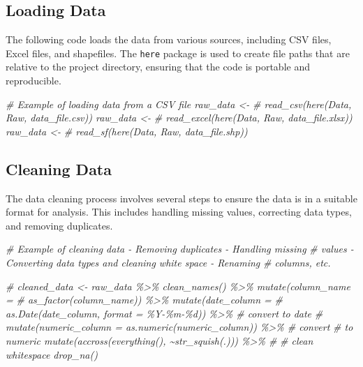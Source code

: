 \documentclass[
  12pt,
]{article}
\newenvironment{Shaded}{\begin{snugshade}}{\end{snugshade}}
\newcommand{\CommentTok}[1]{\textcolor[rgb]{0.56,0.35,0.01}{\textit{#1}}}
\begin{document}
\subsection{Loading Data}\label{loading-data}

The following code loads the data from various sources, including CSV
files, Excel files, and shapefiles. The \texttt{here} package is used to
create file paths that are relative to the project directory, ensuring
that the code is portable and reproducible.

\begin{Shaded}
\begin{Highlighting}[]
\CommentTok{\# Example of loading data from a CSV file raw\_data \textless{}{-}}
\CommentTok{\# read\_csv(here(\textquotesingle{}Data\textquotesingle{}, \textquotesingle{}Raw\textquotesingle{}, \textquotesingle{}data\_file.csv\textquotesingle{})) raw\_data \textless{}{-}}
\CommentTok{\# read\_excel(here(\textquotesingle{}Data\textquotesingle{}, \textquotesingle{}Raw\textquotesingle{}, \textquotesingle{}data\_file.xlsx\textquotesingle{})) raw\_data \textless{}{-}}
\CommentTok{\# read\_sf(here(\textquotesingle{}Data\textquotesingle{}, \textquotesingle{}Raw\textquotesingle{}, \textquotesingle{}data\_file.shp\textquotesingle{}))}
\end{Highlighting}
\end{Shaded}

\subsection{Cleaning Data}\label{cleaning-data}

The data cleaning process involves several steps to ensure the data is
in a suitable format for analysis. This includes handling missing
values, correcting data types, and removing duplicates.

\begin{Shaded}
\begin{Highlighting}[]
\CommentTok{\# Example of cleaning data {-} Removing duplicates {-} Handling missing}
\CommentTok{\# values {-} Converting data types and cleaning white space {-} Renaming}
\CommentTok{\# columns, etc.}

\CommentTok{\# cleaned\_data \textless{}{-} raw\_data \%\textgreater{}\% clean\_names() \%\textgreater{}\% mutate(column\_name =}
\CommentTok{\# as\_factor(column\_name)) \%\textgreater{}\% mutate(date\_column =}
\CommentTok{\# as.Date(date\_column, format = \textquotesingle{}\%Y{-}\%m{-}\%d\textquotesingle{})) \%\textgreater{}\% \# convert to date}
\CommentTok{\# mutate(numeric\_column = as.numeric(numeric\_column)) \%\textgreater{}\% \# convert}
\CommentTok{\# to numeric mutate(accross(everything(), \textasciitilde{}str\_squish(.))) \%\textgreater{}\% \#}
\CommentTok{\# clean whitespace drop\_na()}
\end{Highlighting}
\end{Shaded}
\end{document}

